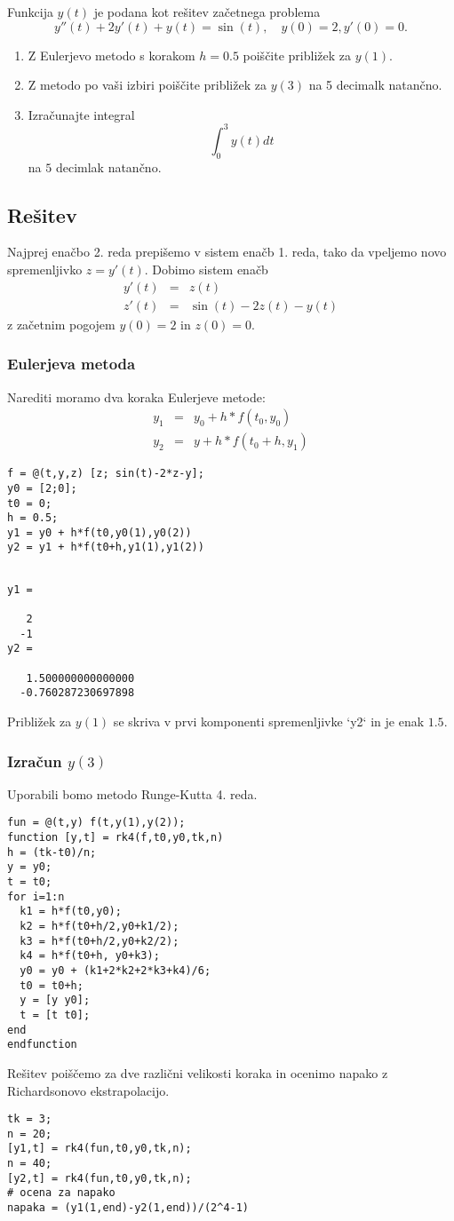 \documentclass[11pt]{article}
\begin{document}
Funkcija $y(t)$ je podana kot rešitev začetnega problema
\[y''(t)+2y'(t)+y(t)=\sin(t),\quad y(0)=2,y'(0)=0.\] 
\begin{enumerate}
\item Z Eulerjevo metodo s korakom $h=0.5$ poiščite približek za $y(1)$.
\item Z metodo po vaši izbiri poiščite približek za $y(3)$ na 5 decimalk natančno.
\item Izračunajte integral
\[\int_0^3y(t)dt\]
na $5$ decimlak natančno.
\end{enumerate}
\subsection{Rešitev}
\label{sec:orgheadline7}
Najprej enačbo 2. reda prepišemo v sistem enačb 1. reda, tako da vpeljemo novo
spremenljivko \(z=y'(t)\). Dobimo sistem enačb
\begin{eqnarray*}
 y'(t) &=& z(t)\\
 z'(t) &=& \sin(t)-2z(t)-y(t) 
\end{eqnarray*}
z začetnim pogojem \(y(0)=2\) in \(z(0)=0\).
\subsubsection{Eulerjeva metoda}
\label{sec:orgheadline4}
Narediti moramo dva koraka Eulerjeve metode:
\begin{eqnarray*}
 y_1 &=& y_0+h*f(t_0,y_0)\\
y_2 &=& y +h*f(t_0+h,y_1)
\end{eqnarray*}
\begin{verbatim}
f = @(t,y,z) [z; sin(t)-2*z-y];
y0 = [2;0];
t0 = 0;
h = 0.5;
y1 = y0 + h*f(t0,y0(1),y0(2))
y2 = y1 + h*f(t0+h,y1(1),y1(2))
\end{verbatim}

\begin{verbatim}

y1 =

   2
  -1
y2 =

   1.500000000000000
  -0.760287230697898
\end{verbatim}
Približek za \(y(1)\) se skriva v prvi komponenti spremenljivke `y2` in je enak \(1.5\).
\subsubsection{Izračun \(y(3)\)}
\label{sec:orgheadline5}
Uporabili bomo metodo Runge-Kutta 4. reda.
\begin{verbatim}
fun = @(t,y) f(t,y(1),y(2));
function [y,t] = rk4(f,t0,y0,tk,n)
h = (tk-t0)/n;
y = y0;
t = t0;
for i=1:n
  k1 = h*f(t0,y0); 
  k2 = h*f(t0+h/2,y0+k1/2);
  k3 = h*f(t0+h/2,y0+k2/2);
  k4 = h*f(t0+h, y0+k3);
  y0 = y0 + (k1+2*k2+2*k3+k4)/6;
  t0 = t0+h;
  y = [y y0];
  t = [t t0];
end
endfunction
\end{verbatim}
Rešitev poiščemo za dve različni velikosti koraka in ocenimo napako z
Richardsonovo ekstrapolacijo.
\begin{verbatim}
tk = 3;
n = 20;
[y1,t] = rk4(fun,t0,y0,tk,n);
n = 40;
[y2,t] = rk4(fun,t0,y0,tk,n);
# ocena za napako
napaka = (y1(1,end)-y2(1,end))/(2^4-1)
\end{verbatim}
\end{document}
